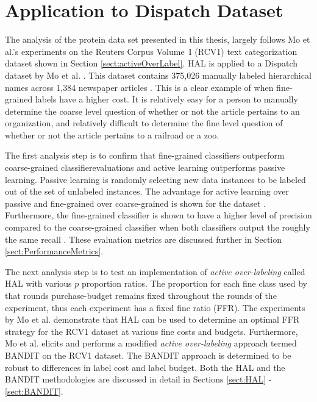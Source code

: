\documentclass[ms]{nuthesis}
\begin{document}
\section{Application to Dispatch Dataset}
\par The analysis of the protein data set presented in this thesis, largely
follows Mo et al.'s \cite{yugi} experiments on the Reuters Corpus Volume~I (RCV1)
 text categorization dataset shown in Section \ref{sect:activeOverLabel}. HAL is
 applied to a Dispatch dataset by Mo et al. \cite{yugi}. This dataset contains 375,026 manually labeled
hierarchical names across 1,384 newspaper articles \cite{Lewis2004}. This is a
clear example of when fine-grained labels have a higher cost. It is relatively
easy for a person to manually
determine the coarse level question of whether or not the article pertains to an organization,
and relatively difficult to determine the fine level question of whether or not the article
pertains to a railroad or a zoo.
\par The first analysis step is to confirm that fine-grained classifiers outperform
coarse-grained classifierevaluations and active learning outperforms passive learning. Passive learning is
randomly selecting new data instances to be labeled out of the set of unlabeled instances.
 The advantage for active learning over passive and fine-grained over coarse-grained is shown for the
 dataset \cite{yugi}. Furthermore, the fine-grained classifier is shown to have a higher level of
 precision compared to the coarse-grained classifier when both classifiers output the roughly the
 same recall  \cite{yugi}. These evaluation metrics are discussed further in
 Section \ref{sect:PerformanceMetrics}.


\par The next analysis step is to test an implementation of \textit{active over-labeling} called
HAL with various $p$ proportion ratios. The proportion
for each fine class used by that rounds purchase-budget remains fixed throughout the rounds of
the experiment, thus each experiment has a fixed fine ratio (FFR). The experiments by
Mo et al. \cite{yugi} demonstrate that HAL can be used to determine an optimal FFR strategy
for the RCV1 dataset at
various fine costs and budgets. Furthermore, Mo et al. elicits and performs a
modified \textit{active over-labeling} approach termed BANDIT on the RCV1
dataset. The BANDIT approach is determined to be robust to differences in label cost and
label budget. Both the HAL and the BANDIT methodologies are discussed in detail in Sections
\ref{sect:HAL} - \ref{sect:BANDIT}.
\end{document}
